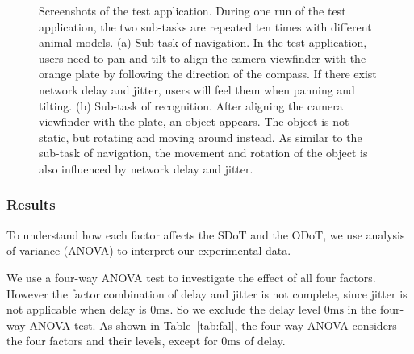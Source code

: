 \begin{figure}
	\centering
	\caption{Screenshots of the test application. During one run of the test application, the two sub-tasks are repeated ten times with different animal models. (a) Sub-task of navigation. In the test application, users need to pan and tilt to align the camera viewfinder with the orange plate by following the direction of the compass. If there exist network delay and jitter, users will feel them when panning and tilting. (b) Sub-task of recognition. After aligning the camera viewfinder with the plate, an object appears. The object is not static, but rotating and moving around instead. As similar to the sub-task of navigation, the movement and rotation of the object is also influenced by network delay and jitter.}
	\label{fig:us}
\end{figure}

\subsubsection{Results}
\label{sec:dao}

To understand how each factor affects the SDoT and the ODoT, we use analysis of variance (ANOVA) to interpret our experimental data.

We use a four-way ANOVA test to investigate the effect of all four factors. However the factor combination of delay and jitter is not complete, since jitter is not applicable when delay is $0\mathrm{ms}$. So we exclude the delay level $0\mathrm{ms}$ in the four-way ANOVA test.
As shown in Table~\ref{tab:fal}, the four-way ANOVA considers the four factors and their levels, except for $0\mathrm{ms}$ of delay.

